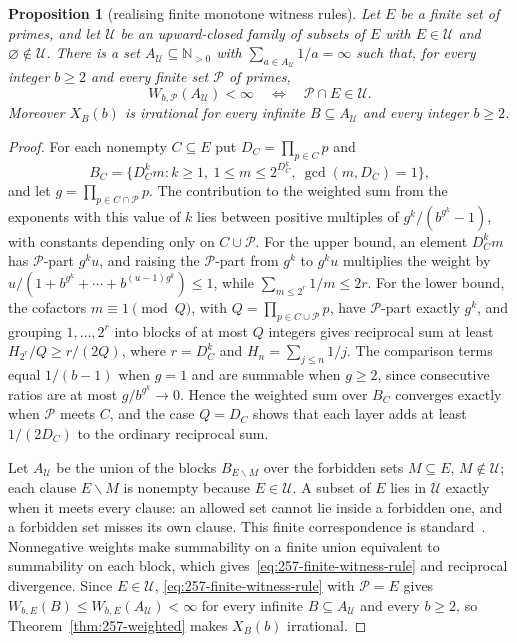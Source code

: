 \documentclass[11pt]{article}
\theoremstyle{plain}
\newtheorem{prop}[thm]{Proposition}
\theoremstyle{definition}
\theoremstyle{remark}
\begin{document}
\begin{prop}[realising finite monotone witness rules]
\label{prop:257-finite-witness-rule}
Let $E$ be a finite set of primes, and let $\mathcal U$ be an
upward-closed family of subsets of $E$ with $E\in\mathcal U$ and
$\varnothing\notin\mathcal U$.  There is a set
$A_{\mathcal U}\subseteq\mathbb N_{>0}$ with
$\sum_{a\in A_{\mathcal U}}1/a=\infty$ such that, for every integer
$b\ge2$ and every finite set $\mathcal P$ of primes,
\begin{equation}\label{eq:257-finite-witness-rule}
 W_{b,\mathcal P}(A_{\mathcal U})<\infty
 \quad\Longleftrightarrow\quad \mathcal P\cap E\in\mathcal U.
\end{equation}
Moreover $X_B(b)$ is irrational for every infinite
$B\subseteq A_{\mathcal U}$ and every integer $b\ge2$.
\end{prop}

\begin{proof}
For each nonempty $C\subseteq E$ put $D_C=\prod_{p\in C}p$ and
\[
 B_C=\{D_C^km:k\ge1,\ 1\le m\le2^{D_C^k},\ \gcd(m,D_C)=1\},
\]
and let $g=\prod_{p\in C\cap\mathcal P}p$. The contribution to the
weighted sum from the exponents with this value of $k$ lies between
positive multiples of $g^k/(b^{g^k}-1)$, with constants depending only
on $C\cup\mathcal P$. For the upper bound, an element $D_C^km$ has
$\mathcal P$-part $g^ku$, and raising the $\mathcal P$-part from $g^k$ to
$g^ku$ multiplies the weight by
$u/(1+b^{g^k}+\cdots+b^{(u-1)g^k})\le1$, while
$\sum_{m\le2^r}1/m\le2r$. For the lower bound, the cofactors $m\equiv1\pmod Q$, with
$Q=\prod_{p\in C\cup\mathcal P}p$, have $\mathcal P$-part exactly $g^k$,
and grouping $1,\dots,2^r$ into blocks of at most $Q$ integers gives
reciprocal sum at least $H_{2^r}/Q\ge r/(2Q)$, where $r=D_C^k$ and
$H_n=\sum_{j\le n}1/j$.  The comparison terms equal $1/(b-1)$ when $g=1$
and are summable when $g\ge2$, since consecutive ratios are at most
$g/b^{g^k}\to0$.  Hence the weighted sum over $B_C$ converges exactly when
$\mathcal P$ meets $C$, and the case $Q=D_C$ shows that each layer adds at
least $1/(2D_C)$ to the ordinary reciprocal sum.

Let $A_{\mathcal U}$ be the union of the blocks $B_{E\smallsetminus M}$ over
the forbidden sets $M\subseteq E$, $M\notin\mathcal U$; each clause
$E\smallsetminus M$ is nonempty because $E\in\mathcal U$.  A subset of $E$ lies
in $\mathcal U$ exactly when it meets every clause: an allowed set cannot
lie inside a forbidden one, and a forbidden set misses its own clause.
This finite correspondence is standard~\cite[Section~2]{sedaghatstephenchindelevitch}.
Nonnegative weights make summability on a finite union equivalent to
summability on each block, which gives~\eqref{eq:257-finite-witness-rule}
and reciprocal divergence.  Since $E\in\mathcal U$,
\eqref{eq:257-finite-witness-rule} with $\mathcal P=E$ gives
$W_{b,E}(B)\le W_{b,E}(A_{\mathcal U})<\infty$ for every infinite
$B\subseteq A_{\mathcal U}$ and every $b\ge2$, so
Theorem~\ref{thm:257-weighted} makes $X_B(b)$ irrational.
\end{proof}
\end{document}
